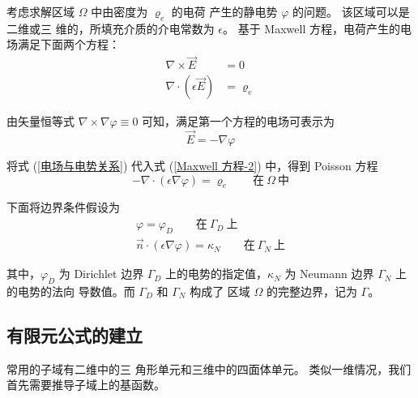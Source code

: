 \par 考虑求解区域 $\Omega$ 中由密度为 $\varrho_e$ 的电荷
产生的静电势 $\varphi$ 的问题。 
该区域可以是二维或三
维的，所填充介质的介电常数为 $\epsilon$。
基于 Maxwell 方程，电荷产生的电场满足下面两个方程：
\begin{align}
    \label{Maxwell 方程-1}
    \nabla\times\vec{E}&=0\\
    \label{Maxwell 方程-2}
    \nabla\cdot(\epsilon \vec{E})&=\varrho_e
\end{align}

\par 由矢量恒等式 $\nabla\times\nabla \varphi\equiv 0$ 可知，满足第一个方程的电场可表示为
\begin{equation}
    \vec{E}=-\nabla\varphi
    \label{电场与电势关系}
\end{equation}
\par 将式 (\ref{电场与电势关系}) 代入式 (\ref{Maxwell 方程-2}) 中，得到 Poisson 方程
\begin{equation}
    -\nabla\cdot(\epsilon\nabla\varphi)=\varrho_e
    \qquad \text{在}\ \Omega\ \text{中}
    \label{泊松方程}
\end{equation}
\par 下面将边界条件假设为
\begin{align}
    \label{标量场边界条件-1}
    \varphi=\varphi_D\qquad \text{在}\ \Gamma_D\ \text{上}\\
    \label{标量场边界条件-2}
    \vec{n}\cdot(\epsilon\nabla\varphi)=\kappa_N\qquad \text{在}\ \Gamma_N\ \text{上}
\end{align}
\par 其中，$\varphi_D$ 为 Dirichlet 边界 
$\Gamma_D$ 上的电势的指定值，$\kappa_N$ 
为 Neumann 边界 $\Gamma_N$ 上的电势的法向
导数值。而 $\Gamma_D$ 和 $\Gamma_N$ 构成了
区域 $\Omega$ 的完整边界，记为 $\Gamma$。

\subsection{有限元公式的建立}

\par 常用的子域有二维中的三
角形单元和三维中的四面体单元。
类似一维情况，我们首先需要推导子域上的基函数。

